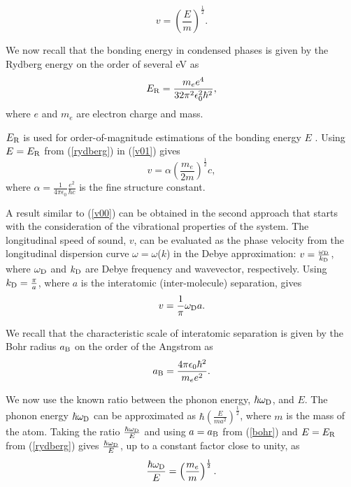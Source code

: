 \documentclass[aps,prl,groupedaddress,fleqn,twocolumn,10pt]{revtex4}
\begin{document}
\begin{equation}
v=\left(\frac{E}{m}\right)^{\frac{1}{2}}.
\label{v01}
\end{equation}

We now recall that the bonding energy in condensed phases is given by the Rydberg energy on the order of several eV \cite{ashcroft} as
\begin{equation}
E_{\rm R}=\frac{m_ee^4}{32\pi^2\epsilon_0^2\hbar^2},
\label{rydberg}
\end{equation}
\noindent where $e$ and $m_e$ are electron charge and mass.

$E_{\rm R}$ is used for order-of-magnitude estimations of the bonding energy $E$ \cite{ashcroft}. Using $E=E_{\rm R}$ from (\ref{rydberg}) in (\ref{v01}) gives
\begin{equation}
v=\alpha\left(\frac{m_e}{2m}\right)^{\frac{1}{2}}c,
\label{v00}
\end{equation}
\noindent where $\alpha=\frac{1}{4\pi\epsilon_0}\frac{e^2}{\hbar c}$ is the fine structure constant.

A result similar to (\ref{v00}) can be obtained in the second approach that starts with the consideration of the vibrational properties of the system. The longitudinal speed of sound, $v$, can be evaluated as the phase velocity from the longitudinal dispersion curve $\omega=\omega$($k$) in the Debye approximation: $v=\frac{\omega_{\rm D}}{k_{\rm D}}$, where $\omega_{\rm D}$ and $k_{\rm D}$ are Debye frequency and wavevector, respectively. Using $k_{\rm D}=\frac{\pi}{a}$, where $a$ is the interatomic (inter-molecule) separation, gives
\begin{equation}
v=\frac{1}{\pi}\omega_{\rm D}a.
\label{v001}
\end{equation}

We recall that the characteristic scale of interatomic separation is given by the Bohr radius $a_{\rm B}$ on the order of the Angstrom as
\begin{equation}
a_{\rm B}=\frac{4\pi\epsilon_0\hbar^2}{m_e e^2}.
\label{bohr}
\end{equation}

We now use the known ratio between the phonon energy, $\hbar\omega_{\rm D}$, and $E$. The phonon energy $\hbar\omega_{\rm D}$ can be approximated as $\hbar\left(\frac{E}{ma^2}\right)^{\frac{1}{2}}$, where $m$ is the mass of the atom. Taking the ratio $\frac{\hbar\omega_{\rm D}}{E}$ and using $a=a_{\rm B}$ from (\ref{bohr}) and $E=E_{\rm R}$ from (\ref{rydberg}) gives $\frac{\hbar\omega_{\rm D}}{E}$, up to a constant factor close to unity, as
\begin{equation}
\frac{\hbar\omega_{\rm D}}{E}=\left(\frac{m_e}{m}\right)^{\frac{1}{2}}.
\label{ratio}
\end{equation}
\end{document}
